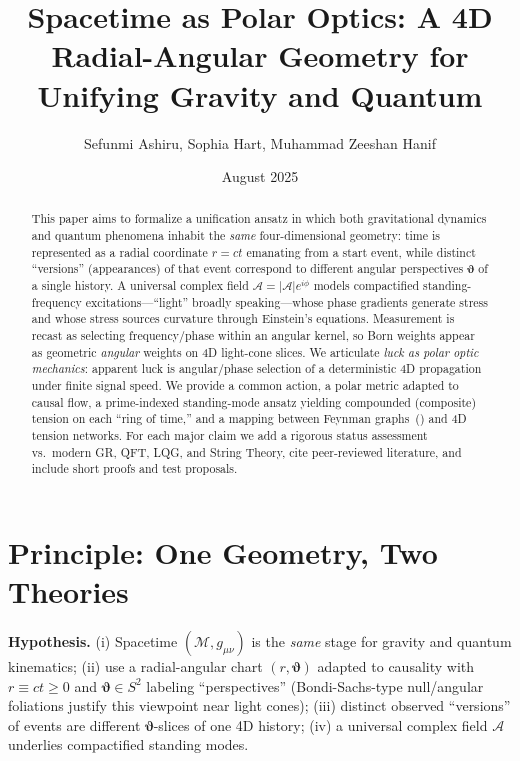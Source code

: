 \documentclass[reprint,amsmath,amssymb,aps,pra]{revtex4-2} %
\newcommand{\M}{\mathcal{M}}                   %
\newcommand{\g}{g}                             %
\newcommand{\A}{\mathcal{A}}                   %
\newcommand{\polangb}{\boldsymbol{\vartheta}}  %
\begin{document}
\title{Spacetime as Polar Optics: A 4D Radial-Angular Geometry for Unifying Gravity and Quantum}
\author{Sefunmi Ashiru, Sophia Hart, Muhammad Zeeshan Hanif}
\date{August 2025}

\begin{abstract}
This paper aims to formalize a unification ansatz in which both gravitational dynamics and quantum phenomena inhabit the \emph{same} four-dimensional geometry: time is represented as a radial coordinate $r=ct$ emanating from a start event, while distinct ``versions'' (appearances) of that event correspond to different angular perspectives $\polangb$ of a single history. A universal complex field $\A=|\A|e^{i\phi}$ models compactified standing-frequency excitations---``light'' broadly speaking---whose phase gradients generate stress and whose stress sources curvature through Einstein's equations. Measurement is recast as selecting frequency/phase within an angular kernel, so Born weights appear as geometric \emph{angular} weights on 4D light-cone slices. We articulate \emph{luck as polar optic mechanics}: apparent luck is angular/phase selection of a deterministic 4D propagation under finite signal speed. We provide a common action, a polar metric adapted to causal flow, a prime-indexed standing-mode ansatz yielding compounded (composite) tension on each ``ring of time,'' and a mapping between Feynman graphs~(\cite{FeynmanHibbs1965}) and 4D tension networks. For each major claim we add a rigorous status assessment vs.~modern GR, QFT, LQG, and String Theory, cite peer-reviewed literature, and include short proofs and test proposals.
\end{abstract}

\maketitle

\section{Principle: One Geometry, Two Theories}
\textbf{Hypothesis.}
(i) Spacetime $(\M,\g_{\mu\nu})$ is the \emph{same} stage for gravity and quantum kinematics; (ii) use a radial-angular chart $(r,\polangb)$ adapted to causality with $r\equiv ct\ge 0$ and $\polangb\in S^2$ labeling ``perspectives'' (Bondi-Sachs-type null/angular foliations justify this viewpoint near light cones); (iii) distinct observed ``versions'' of events are different $\polangb$-slices of one 4D history; (iv) a universal complex field $\A$ underlies compactified standing modes.
\end{document}
